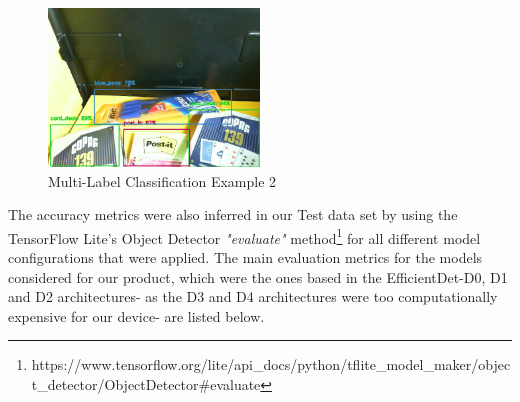 \documentclass[openright]{normas-utf-tex} %
\begin{document}
\begin{figure}[H]
	\centering
	\includegraphics[width=0.5\textwidth]{./images/multilabel-classification-2.png}
	\caption[Multi-Label Classification Example 2]{Multi-Label Classification Example 2}
\end{figure}

The accuracy metrics were also inferred in our Test data set by using the TensorFlow Lite's 
Object Detector \textit{"evaluate"} method\footnote{https://www.tensorflow.org/lite/api\_docs/python/tflite\_model\_maker/object\_detector/ObjectDetector\#evaluate}
for all different model configurations that were applied. 
The main evaluation metrics for the models considered for our product, which were the ones based 
in the EfficientDet-D0, D1 and D2 architectures- as the D3 and D4 architectures were too 
computationally expensive for our device- are listed below. 
\end{document}
